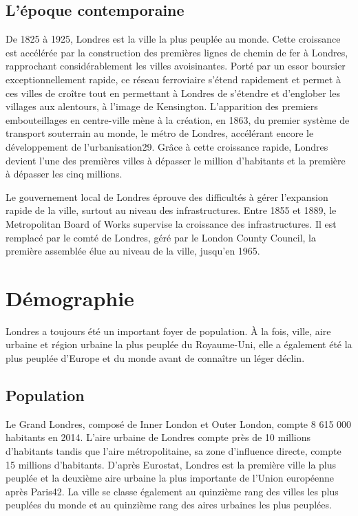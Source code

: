 \documentclass{article}
\begin{document}
\subsection{L'époque contemporaine}
De 1825 à 1925, Londres est la ville la plus peuplée au monde. Cette croissance est accélérée par la construction des premières lignes de chemin de fer à Londres, rapprochant considérablement les villes avoisinantes. Porté par un essor boursier exceptionnellement rapide, ce réseau ferroviaire s'étend rapidement et permet à ces villes de croître tout en permettant à Londres de s'étendre et d'englober les villages aux alentours, à l'image de Kensington. L'apparition des premiers embouteillages en centre-ville mène à la création, en 1863, du premier système de transport souterrain au monde, le métro de Londres, accélérant encore le développement de l'urbanisation29. Grâce à cette croissance rapide, Londres devient l'une des premières villes à dépasser le million d'habitants et la première à dépasser les cinq millions.

Le gouvernement local de Londres éprouve des difficultés à gérer l'expansion rapide de la ville, surtout au niveau des infrastructures. Entre 1855 et 1889, le Metropolitan Board of Works supervise la croissance des infrastructures. Il est remplacé par le comté de Londres, géré par le London County Council, la première assemblée élue au niveau de la ville, jusqu'en 1965.

\newpage

\section{Démographie}

Londres a toujours été un important foyer de population. À la fois, ville, aire urbaine et région urbaine la plus peuplée du Royaume-Uni, elle a également été la plus peuplée d'Europe et du monde avant de connaître un léger déclin.


\subsection{Population}
Le Grand Londres, composé de Inner London et Outer London, compte 8 615 000 habitants en 2014. L'aire urbaine de Londres compte près de 10 millions d'habitants tandis que l'aire métropolitaine, sa zone d'influence directe, compte 15 millions d'habitants. D'après Eurostat, Londres est la première ville la plus peuplée et la deuxième aire urbaine la plus importante de l'Union européenne après Paris42. La ville se classe également au quinzième rang des villes les plus peuplées du monde et au quinzième rang des aires urbaines les plus peuplées.
\end{document}
